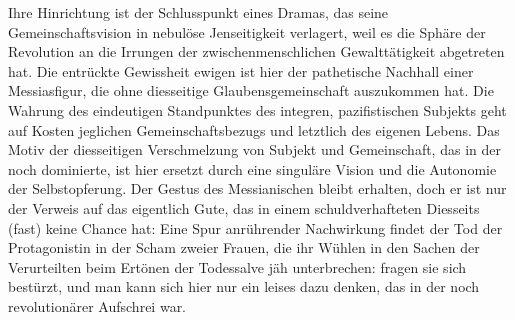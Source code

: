 Ihre Hinrichtung ist der Schlusspunkt eines Dramas, das seine 
Gemeinschaftsvision in nebulöse Jenseitigkeit verlagert, weil es die
Sphäre der Revolution an die Irrungen der zwischenmenschlichen Gewalttätigkeit
abgetreten hat. Die entrückte Gewissheit ewigen \Cite{Werk-Volkes} ist hier der
pathetische Nachhall einer Messiasfigur, die ohne diesseitige
Glaubensgemeinschaft auszukommen hat. Die Wahrung des eindeutigen Standpunktes
des integren,  pazifistischen Subjekts geht auf Kosten jeglichen 
Gemeinschaftsbezugs und letztlich des eigenen Lebens. Das Motiv der
diesseitigen Verschmelzung von Subjekt und
Gemeinschaft, das in der  noch dominierte, ist hier ersetzt durch
eine singuläre Vision und die Autonomie der Selbstopferung. Der Gestus des
Messianischen bleibt erhalten, doch er ist nur der Verweis auf das
eigentlich Gute, das in einem schuldverhafteten Diesseits (fast) keine Chance hat:
Eine Spur anrührender Nachwirkung findet der Tod der Protagonistin in der Scham zweier 
Frauen, die ihr Wühlen in den Sachen der Verurteilten beim Ertönen der
Todessalve jäh unterbrechen: \Cite{Schwester, warum tun wir
  das?}  
fragen sie sich bestürzt, und man kann sich hier nur ein leises \Cite{Wir sind
  doch Menschen.} dazu denken, das in der  noch
revolutionärer Aufschrei war.



